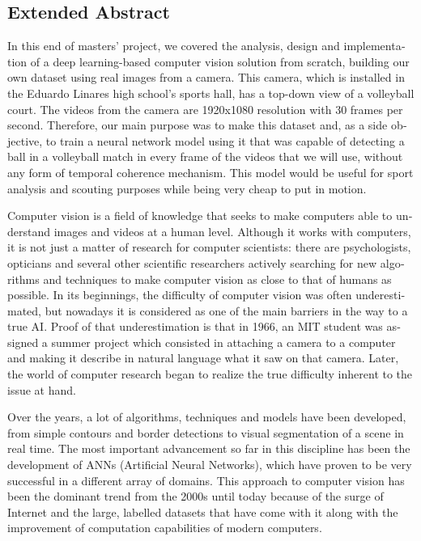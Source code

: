 \newpage

\begin{otherlanguage}{english}
    
\section*{Extended Abstract}

In this end of masters’ project, we covered the analysis, design and implementation of a deep learning-based computer vision solution from scratch, building our own dataset using real images from a camera. This camera, which is installed in the Eduardo Linares high school’s sports hall, has a top-down view of a volleyball court. The videos from the camera are 1920x1080 resolution with 30 frames per second.
Therefore, our main purpose was to make this dataset and, as a side objective, to train a neural network model using it that was capable of detecting a ball in a volleyball match in every frame of the videos that we will use, without any form of temporal coherence mechanism. This model would be useful for sport analysis and scouting purposes while being very cheap to put in motion.

Computer vision is a field of knowledge that seeks to make computers able to understand images and videos at a human level. Although it works with computers, it is not just a matter of research for computer scientists: there are psychologists, opticians and several other scientific researchers actively searching for new algorithms and techniques to make computer vision as close to that of humans as possible. In its beginnings, the difficulty of computer vision was often underestimated, but nowadays it is considered as one of the main barriers in the way to a true AI. Proof of that underestimation is that in 1966, an MIT student was assigned a summer project which consisted in attaching a camera to a computer and making it describe in natural language what it saw on that camera. Later, the world of computer research began to realize the true difficulty inherent to the issue at hand.

Over the years, a lot of algorithms, techniques and models have been developed, from simple contours and border detections to visual segmentation of a scene in real time. The most important advancement so far in this discipline has been the development of ANNs (Artificial Neural Networks), which have proven to be very successful in a different array of domains. This approach to computer vision has been the dominant trend from the 2000s until today because of the surge of Internet and the large, labelled datasets that have come with it along with the improvement of computation capabilities of modern computers.


\end{otherlanguage}
